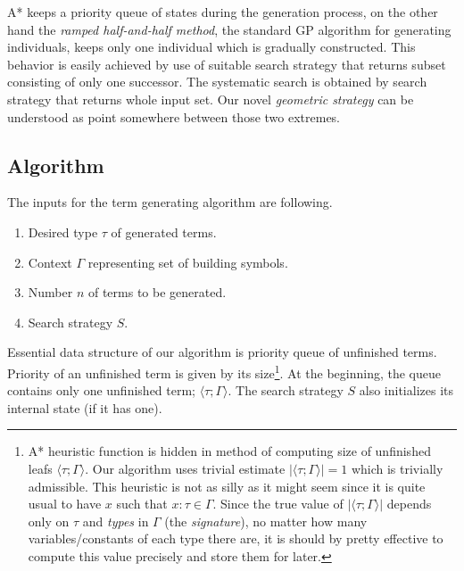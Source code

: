 \documentclass{llncs}
\newcommand{\ul}[2]{\langle #1 ; #2 \rangle}
\begin{document}
A* keeps a priority queue of states during the generation process,
on the other hand the \textit{ramped half-and-half method}, 
the standard GP algorithm for generating individuals, 
keeps only one individual which is gradually constructed. This 
behavior is easily achieved by use of suitable search strategy 
that returns subset consisting of only one successor.
The systematic search is obtained by search strategy that 
returns whole input set.      
Our novel \textit{geometric strategy} can be understood as
point somewhere between those two extremes.

\subsection{Algorithm}

The inputs for the term generating algorithm are following.
\begin{enumerate}
 \item Desired type $\tau$ of generated terms.
 \item Context $\Gamma$ representing set of building symbols.
 \item Number $n$ of terms to be generated.
 \item Search strategy $S$. 
\end{enumerate}

Essential data structure of our algorithm 
is priority queue of unfinished terms. 
Priority of an unfinished term is given by its size\footnote{
A* heuristic function is hidden in method of computing
size of unfinished leafs $\ul{\tau}{\Gamma}$. Our algorithm uses
trivial estimate $\vert\ul{\tau}{\Gamma}\vert = 1$ which is trivially admissible.
This heuristic is not as silly as it might seem since it is
quite usual to have $x$ such that $x : \tau \in \Gamma$.
Since the true value of $\vert\ul{\tau}{\Gamma}\vert$ depends only on
$\tau$ and \textit{types} in $\Gamma$ (the \textit{signature}), 
no matter how many variables/constants of
each type there are, it is should by pretty effective to compute this
value precisely and store them for later. 
}.
At the beginning, the queue contains only one unfinished term; 
$\ul{\tau}{\Gamma}$. The search strategy $S$ also 
initializes its internal state (if it has one).
\end{document}
